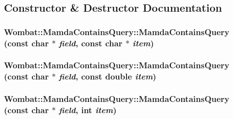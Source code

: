 \subsection{Constructor \& Destructor Documentation}
\hypertarget{classWombat_1_1MamdaContainsQuery_c70989acac6016e3f1d77cc61f2574a7}{
\subsubsection[MamdaContainsQuery]{\setlength{\rightskip}{0pt plus 5cm}Wombat::Mamda\-Contains\-Query::Mamda\-Contains\-Query (const char $\ast$ {\em field}, const char $\ast$ {\em item})}}
\label{classWombat_1_1MamdaContainsQuery_c70989acac6016e3f1d77cc61f2574a7}


\hypertarget{classWombat_1_1MamdaContainsQuery_57fbf5d8b2248852c03b2e6ce25f6358}{
\subsubsection[MamdaContainsQuery]{\setlength{\rightskip}{0pt plus 5cm}Wombat::Mamda\-Contains\-Query::Mamda\-Contains\-Query (const char $\ast$ {\em field}, const double {\em item})}}
\label{classWombat_1_1MamdaContainsQuery_57fbf5d8b2248852c03b2e6ce25f6358}


\hypertarget{classWombat_1_1MamdaContainsQuery_ba0671c89ab035ce5c9c63d594a26168}{
\subsubsection[MamdaContainsQuery]{\setlength{\rightskip}{0pt plus 5cm}Wombat::Mamda\-Contains\-Query::Mamda\-Contains\-Query (const char $\ast$ {\em field}, int {\em item})}}
\label{classWombat_1_1MamdaContainsQuery_ba0671c89ab035ce5c9c63d594a26168}




